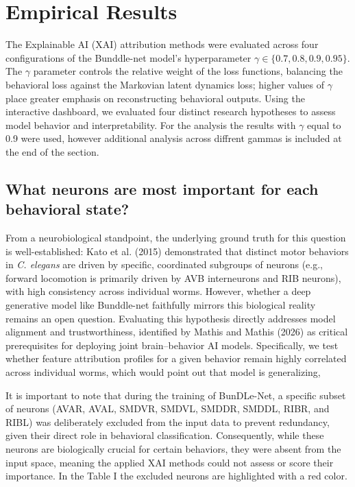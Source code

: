 \documentclass{article}
\begin{document}
\section{Empirical Results}

The Explainable AI (XAI) attribution methods were evaluated across four configurations of the Bunddle-net model's hyperparameter $\gamma \in \{0.7, 0.8, 0.9, 0.95\}$. The $\gamma$ parameter controls the relative weight of the loss functions, balancing the behavioral loss against the Markovian latent dynamics loss; higher values of $\gamma$ place greater emphasis on reconstructing behavioral outputs. Using the interactive dashboard, we evaluated four distinct research hypotheses to assess model behavior and interpretability.  For the analysis the results with $\gamma$ equal to 0.9 were used, however additional analysis across diffrent gammas is included at the end of the section. 

\subsection{What neurons are most important for each behavioral state?}

From a neurobiological standpoint, the underlying ground truth for this question is well-established: Kato et al. (2015) \cite{kato2015global} demonstrated that distinct motor behaviors in \textit{C. elegans} are driven by specific, coordinated subgroups of neurons (e.g., forward locomotion is primarily driven by AVB interneurons and RIB neurons), with high consistency across individual worms. However, whether a deep generative model like Bunddle-net faithfully mirrors this biological reality remains an open question. Evaluating this hypothesis directly addresses model alignment and trustworthiness, identified by Mathis and Mathis (2026) \cite{mathis2026joint} as critical prerequisites for deploying joint brain–behavior AI models. Specifically, we test whether feature attribution profiles for a given behavior remain highly correlated across individual worms, which would point out that model is generalizing,

It is important to note that during the training of BunDLe-Net, a specific subset of neurons (AVAR, AVAL, SMDVR, SMDVL, SMDDR, SMDDL, RIBR, and RIBL) was deliberately excluded from the input data to prevent redundancy, given their direct role in behavioral classification. Consequently, while these neurons are biologically crucial for certain behaviors, they were absent from the input space, meaning the applied XAI methods could not assess or score their importance. In the Table I the excluded neurons are highlighted with a red color. 
\end{document}
